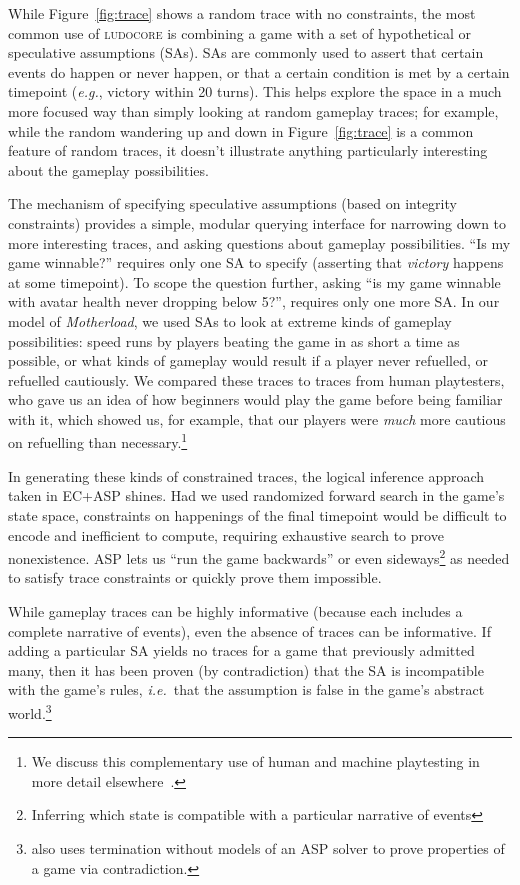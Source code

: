 \documentclass[conference]{IEEEtran}
\newcommand{\ludocore}{\textsc{ludocore}}
\begin{document}
While Figure~\ref{fig:trace} shows a random trace with no constraints, the most
common use of \ludocore{} is combining a game with a set of hypothetical or
speculative assumptions (SAs). SAs are commonly used to assert that certain
events do happen or never happen, or that a certain condition is met by a
certain timepoint (\emph{e.g.}, victory within 20 turns). This helps explore
the space in a much more focused way than simply looking at random gameplay
traces; for example, while the random wandering up and down in
Figure~\ref{fig:trace} is a common feature of random traces, it doesn't
illustrate anything particularly interesting about the gameplay possibilities.

The mechanism of specifying speculative assumptions (based on integrity
constraints) provides a simple, modular querying interface for narrowing down
to more interesting traces, and asking questions about gameplay possibilities.
``Is my game winnable?'' requires only one SA to specify (asserting that
\emph{victory} happens at some timepoint). To scope the question further,
asking ``is my game winnable with avatar health never dropping below 5?'',
requires only one more SA. In our model of \emph{Motherload}, we used SAs to
look at extreme kinds of gameplay possibilities: speed runs by players beating
the game in as short a time as possible, or what kinds of gameplay would result
if a player never refuelled, or refuelled cautiously. We compared these traces
to traces from human playtesters, who gave us an idea of how beginners would
play the game before being familiar with it, which showed us, for example, that
our players were \emph{much} more cautious on refuelling than
necessary.\footnote{We discuss this complementary use of human and machine
playtesting in more detail elsewhere~\citep{AIIDE09}.}

In generating these kinds of constrained traces, the logical inference approach
taken in EC+ASP shines. Had we used randomized forward search in the game's
state space, constraints on happenings of the final timepoint would be
difficult to encode and inefficient to compute, requiring exhaustive search to
prove nonexistence.  ASP lets us ``run the game backwards'' or even
sideways\footnote{Inferring which state is compatible with a particular
narrative of events} as needed to satisfy trace constraints or quickly prove
them impossible.

While gameplay traces can be highly informative (because each includes a
complete narrative of events), even the absence of traces can be informative.
If adding a particular SA yields no traces for a game that previously admitted
many, then it has been proven (by contradiction) that the SA is incompatible
with the game's rules, \emph{i.e.}\ that the assumption is false in the game's abstract
world.\footnote{\citet{Thielscher:singleplayer} also uses termination without
models of an ASP solver to prove properties of a game via contradiction.}
\end{document}
